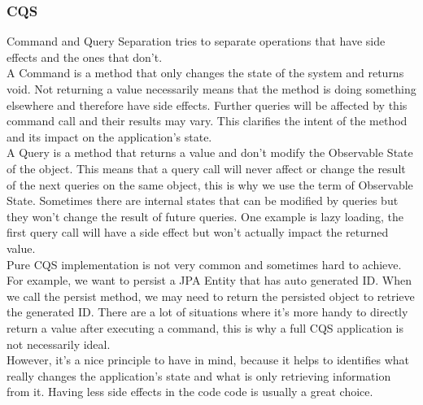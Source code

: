 \subsubsection{CQS}
Command and Query Separation tries to separate operations that have
side effects and the ones that don't. \\
\newline
A Command is a method that only changes the state of the system and
returns void.
Not returning a value necessarily means that the method is doing
something elsewhere and therefore have side effects.
Further queries will be affected by this command call and their results
may vary.
This clarifies the intent of the method and its impact on the
application's state. \\
\newline
A Query is a method that returns a value and don't modify the
Observable State of the object.
This means that a query call will never affect or change the result of
the next queries on the same object, this is why we use the term of
Observable State.
Sometimes there are internal states that can be modified by queries but
they won't change the result of future queries.
One example is lazy loading, the first query call will have a side effect
but won't actually impact the returned value. \\
\newline
Pure CQS implementation is not very common and sometimes hard to achieve.
For example, we want to persist a JPA Entity that has auto generated ID.
When we call the persist method, we may need to return the persisted
object to retrieve the generated ID.
There are a lot of situations where it's more handy to directly return a
value after executing a command, this is why a full CQS application is
not necessarily ideal. \\
However, it's a nice principle to have in mind, because it helps to
identifies what really changes the application's state and what is only
retrieving information from it.
Having less side effects in the code code is usually a great choice.
